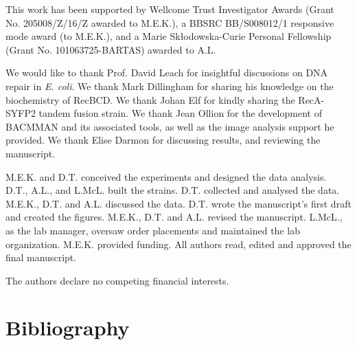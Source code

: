 \documentclass[times, twoside]{zHenriquesLab-StyleBioRxiv}
\begin{document}


\begin{funding}
    This work has been supported by Wellcome Trust Investigator Awards (Grant No. 205008/Z/16/Z awarded to M.E.K.), a BBSRC BB/S008012/1 responsive mode award (to M.E.K.), and a Marie Skłodowska-Curie Personal Fellowship (Grant No. 101063725-BARTAS) awarded to A.L.
\end{funding}

\begin{acknowledgements}
    We would like to thank Prof. David Leach for insightful discussions on DNA repair in \emph{E. coli}. We thank Mark Dillingham for sharing his knowledge on the biochemistry of RecBCD. We thank Johan Elf for kindly sharing the RecA-SYFP2 tandem fusion strain. We thank Jean Ollion for the development of BACMMAN and its associated tools, as well as the image analysis support he provided. We thank Elise Darmon for discussing results, and reviewing the manuscript.
\end{acknowledgements}

\begin{contributions}
    M.E.K. and D.T. conceived the experiments and designed the data analysis. D.T., A.L., and L.McL. built the strains. D.T. collected and analysed the data. M.E.K., D.T. and A.L. discussed the data. D.T. wrote the manuscript's first draft and created the figures. M.E.K., D.T. and A.L. revised the manuscript. L.McL., as the lab manager, oversaw order placements and maintained the lab organization. M.E.K. provided funding. All authors read, edited and approved the final manuscript.
\end{contributions}

\begin{interests}
    The authors declare no competing financial interests.
\end{interests}

\section*{Bibliography}


\onecolumn
\newpage


\end{document}
